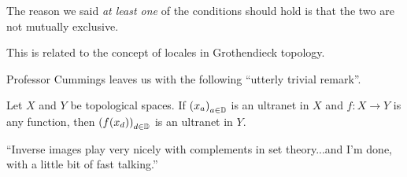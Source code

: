 The reason we said \textit{at least one} of the conditions should hold is that the two are not mutually exclusive. \sorry{}

This is related to the concept of locales in Grothendieck topology.

Professor Cummings leaves us with the following ``utterly trivial remark''.

\begin{boxexercise}\label{Ch2:Exo:Ultranet_comp}
    Let $X$ and $Y$ be topological spaces. If $\left( x_a \right)_{a \in \mathbb{D}}$ is an ultranet in $X$ and $f : X \to Y$ is any function, then $\left( f\!\left( x_d \right) \right)_{d \in \mathbb{D}}$ is an ultranet in $Y$.
\end{boxexercise}
\begin{remark}
    ``Inverse images play very nicely with complements in set theory...and I'm done, with a little bit of fast talking.''
\end{remark}